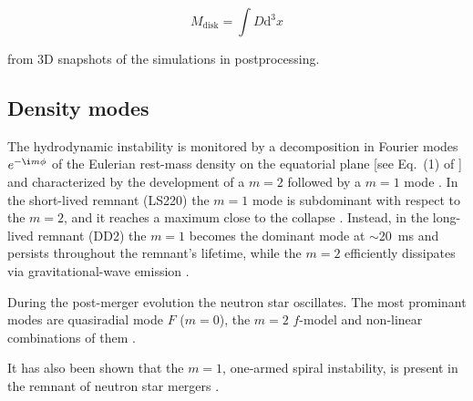 \documentclass[11pt,a4paper,headinclude=true,DIV=14,BCOR=8mm,chapterprefix,listof=totoc,twoside,openright,abstracton]{scrbook}
\newcommand{\dd}{\text{d}}
\newcommand{\eg}{\textit{e.g.}}
\begin{document}
\begin{equation}
\label{eq:method:mdisk}
M_{\text{disk}} = \int D \dd^3 x
\end{equation}

from 3D snapshots of the simulations in postprocessing.






\subsection{Density modes}


The hydrodynamic instability is monitored by a decomposition in Fourier modes
$e^{-\i m\phi}$ of the Eulerian rest-mass density on the equatorial plane 
[see Eq.~(1) of \citep{Radice:2016gym}] and characterized by the
development of a $m=2$ followed by a $m=1$ mode 
\citep{East:2015vix,Paschalidis:2015mla,Radice:2016gym,Lehner:2016wjg,Bernuzzi:2013rza,Kastaun:2014fna}.
In the short-lived remnant (LS220) the $m=1$ mode
is subdominant with respect to the $m=2$, and it reaches a maximum close to the collapse
\citep{Bernuzzi:2013rza}. Instead, in the long-lived remnant (DD2) the $m=1$
becomes the dominant mode at $\sim$20~ms and persists throughout the
remnant's lifetime, while the $m=2$ efficiently dissipates via
gravitational-wave emission \citep{Bernuzzi:2015opx,Radice:2016gym}.


During the post-merger evolution the neutron star oscillates. The most prominant modes are quasiradial mode $F$ ($m=0$), the $m=2$ $f$-model and non-linear combinations of them \citep[\eg][]{Shibata:2000jt,Stergioulas:2011gd}.

It has also been shown that the $m=1$, one-armed spiral instability, is present in the remnant of neutron star mergers \citep{Paschalidis:2015mla,Radice:2016gym,East:2016zvv}.
\end{document}
